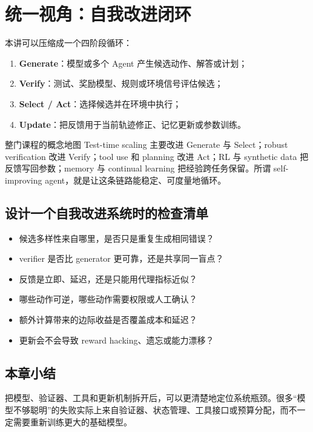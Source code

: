\section{统一视角：自我改进闭环}

本讲可以压缩成一个四阶段循环：

\begin{enumerate}
    \item \textbf{Generate}：模型或多个 Agent 产生候选动作、解答或计划；
    \item \textbf{Verify}：测试、奖励模型、规则或环境信号评估候选；
    \item \textbf{Select / Act}：选择候选并在环境中执行；
    \item \textbf{Update}：把反馈用于当前轨迹修正、记忆更新或参数训练。
\end{enumerate}

\begin{importantbox}{整门课程的概念地图}
Test-time scaling 主要改进 Generate 与 Select；robust verification 改进 Verify；tool use 和 planning 改进 Act；RL 与 synthetic data 把反馈写回参数；memory 与 continual learning 把经验跨任务保留。所谓 self-improving agent，就是让这条链路能稳定、可度量地循环。
\end{importantbox}

\subsection{设计一个自我改进系统时的检查清单}

\begin{itemize}
    \item 候选多样性来自哪里，是否只是重复生成相同错误？
    \item verifier 是否比 generator 更可靠，还是共享同一盲点？
    \item 反馈是立即、延迟，还是只能用代理指标近似？
    \item 哪些动作可逆，哪些动作需要权限或人工确认？
    \item 额外计算带来的边际收益是否覆盖成本和延迟？
    \item 更新会不会导致 reward hacking、遗忘或能力漂移？
\end{itemize}

\subsection{本章小结}

把模型、验证器、工具和更新机制拆开后，可以更清楚地定位系统瓶颈。很多“模型不够聪明”的失败实际上来自验证器、状态管理、工具接口或预算分配，而不一定需要重新训练更大的基础模型。

